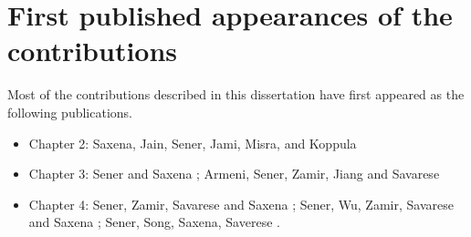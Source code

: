 \section{First published appearances of the contributions}

Most of the contributions described in this dissertation have first appeared as the following publications.
\begin{itemize}
\item Chapter 2: Saxena, Jain, Sener, Jami, Misra, and Koppula \cite{robobrain}
\item Chapter 3: Sener and Saxena \cite{rcrf}; Armeni, Sener, Zamir, Jiang and Savarese \cite{cvpr_iro}
\item Chapter 4: Sener, Zamir, Savarese and Saxena \cite{iccv_ozan}; Sener, Wu, Zamir, Savarese and Saxena \cite{ijcv_ozan}; Sener, Song, Saxena, Saverese \cite{da_ozan}.
\end{itemize}
